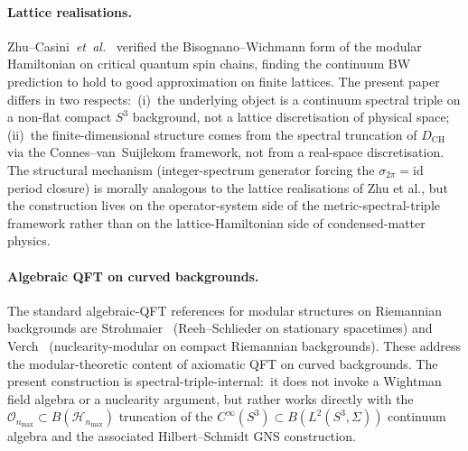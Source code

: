 \documentclass[11pt,a4paper]{article}
\theoremstyle{plain}
\theoremstyle{definition}
\newcommand{\nmax}{n_{\max}}
\newcommand{\sthree}{S^{3}}
\newcommand{\Hilb}{\mathcal{H}}
\newcommand{\Op}{\mathcal{O}}
\newcommand{\DCH}{D_{\mathrm{CH}}}
\begin{document}
\paragraph{Lattice realisations.}
Zhu--Casini~\emph{et~al.}~\cite{zhu_casini2020} verified the
Bisognano--Wichmann form of the modular Hamiltonian on critical
quantum spin chains, finding the continuum BW prediction to hold to
good approximation on finite lattices. The present paper differs in
two respects:\ (i)~the underlying object is a continuum spectral
triple on a non-flat compact $\sthree$ background, not a lattice
discretisation of physical space; (ii)~the finite-dimensional
structure comes from the spectral truncation of $\DCH$ via the
Connes--van~Suijlekom framework, not from a real-space discretisation.
The structural mechanism (integer-spectrum generator forcing the
$\sigma_{2\pi} = \mathrm{id}$ period closure) is morally analogous to
the lattice realisations of Zhu et al., but the construction lives on
the operator-system side of the metric-spectral-triple framework
rather than on the lattice-Hamiltonian side of condensed-matter
physics.

\paragraph{Algebraic QFT on curved backgrounds.}
The standard algebraic-QFT references for modular structures on
Riemannian backgrounds are
Strohmaier~\cite{strohmaier2006} (Reeh--Schlieder on stationary
spacetimes) and Verch~\cite{verch2001} (nuclearity-modular on compact
Riemannian backgrounds). These address the modular-theoretic content
of axiomatic QFT on curved backgrounds. The present construction is
spectral-triple-internal:\ it does not invoke a Wightman field algebra
or a nuclearity argument, but rather works directly with the
$\Op_{\nmax} \subset B(\Hilb_{\nmax})$ truncation of the
$C^\infty(\sthree) \subset B(L^2(\sthree, \Sigma))$ continuum algebra
and the associated Hilbert--Schmidt GNS construction.
\end{document}
